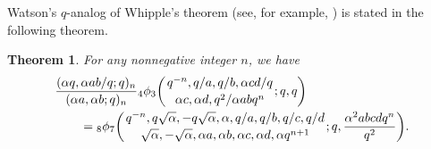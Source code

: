 \documentclass[pdftex]{sigma}
\numberwithin{equation}{section}
\newtheorem{Theorem}{Theorem}[section]
\begin{document}
Watson's $q$-analog of Whipple's theorem (see, for example, \cite[equation~(2.5.1)]{Gas+Rah}) is stated in the following theorem.
\begin{Theorem}\label{WatsonWhipplethm} For any nonnegative integer $n$, we have
	\begin{align*}%
		&\frac{(\alpha q, \alpha ab/q; q)_n}{(\alpha a, \alpha b; q)_n}
		{_4\phi_3}\biggl({{q^{-n}, q/a, q/b, \alpha cd/q }\atop{\alpha c, \alpha d, q^2/{\alpha ab q^n}}}; q, q\biggr)\\
		&\qquad{}={_8\phi_7}\biggl({{q^{-n}, q\sqrt{\alpha}, -q\sqrt{\alpha}, \alpha, q/a, q/b, q/c, q/d}
			\atop{\sqrt{\alpha}, -\sqrt{\alpha}, \alpha a, \alpha b, \alpha c, \alpha d, \alpha q^{n+1}}}; q, \frac{\alpha^2 abcdq^n}{q^2}\biggr).\nonumber
	\end{align*}
\end{Theorem}
\end{document}
